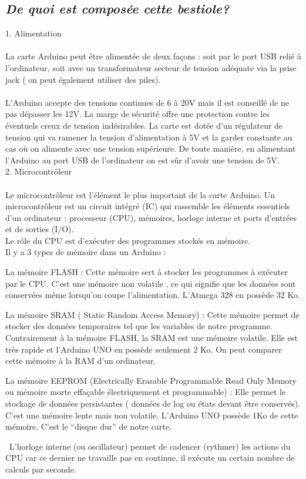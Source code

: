 \documentclass[12pt,a4paper]{article}
\begin{document}
\subsection{\textit{\textbf{De quoi est composée cette bestiole?}}}
1. Alimentation
\\
\\
La carte Arduino peut être alimentée de deux façons : soit par le port USB relié à l’ordinateur, soit avec  un transformateur secteur de tension adéquate via la prise jack ( on peut également utiliser des piles).
\\
\\
L’Arduino accepte des tensions continues de 6 à 20V mais il est conseillé de ne pas dépasser les 12V. La marge de sécurité offre une protection contre les éventuels creux de tension indésirables. La carte est dotée d’un régulateur de tension qui va ramener la tension d’alimentation à  5V et la garder constante au cas où on alimente avec une tension supérieure. De toute manière, en alimentant l’Arduino au port USB de l’ordinateur on est sûr d’avoir une tension de 5V.
\\
2. Microcontrôleur
\\
\\
Le microcontrôleur est l'élément le plus important de la carte Arduino.
 Un microcontrôleur est un circuit intégré (IC) qui rassemble les éléments essentiels d’un ordinateur : processeur (CPU), mémoires, horloge interne et ports d’entrées et de sorties (I/O).
 \\
 Le rôle du CPU est d'exécuter des programmes stockés en mémoire.
\\
Il y a 3 types de mémoire dans un Arduino :
\\
\begin{compactitem}

\item La mémoire FLASH : Cette mémoire sert à stocker les programmes à exécuter par le CPU. C’est une mémoire non volatile , ce qui signifie que les données sont conservées même lorsqu’on coupe l’alimentation. L’Atmega 328 en possède 32 Ko.
\\
\item La mémoire SRAM ( Static Random Access Memory) : Cette mémoire permet de stocker des données temporaires tel que les variables de notre programme. Contrairement à la mémoire FLASH, la SRAM est une mémoire volatile. Elle est très rapide et l’Arduino UNO en possède seulement 2 Ko. On peut comparer cette mémoire à la RAM d’un ordinateur.
\\
\item La mémoire EEPROM (Electrically Erasable Programmable Read Only Memory ou mémoire morte effaçable électriquement et programmable) : Elle permet le stockage de données persistantes ( données de log ou états devant être conservés). C’est une mémoire lente mais non volatile. L’Arduino UNO possède 1Ko de cette mémoire. C’est le “disque dur” de notre carte.
\\
\end{compactitem}
\
L’horloge interne (ou oscillateur) permet de cadencer (rythmer) les actions du CPU car ce dernier ne travaille pas en continue, il exécute un certain nombre de calculs par seconde.
\end{document}
